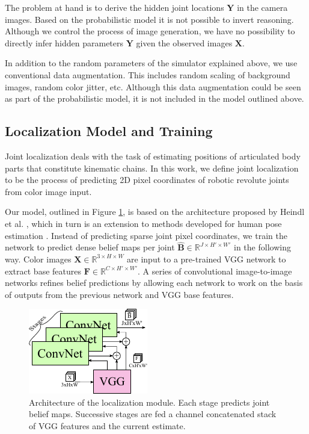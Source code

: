 \documentclass[conference]{IEEEtran}
\begin{document}
    The problem at hand is to derive the hidden joint locations $\mathbf{Y}$ in the camera images. Based on the probabilistic model it is not possible to invert reasoning. Although we control the process of image generation, we have no possibility to directly infer hidden parameters $\mathbf{Y}$ given the observed images $\mathbf{X}$. 
    
    In addition to the random parameters of the simulator explained above, we use conventional data augmentation. This includes random scaling of background images, random color jitter, etc. Although this data augmentation could be seen as part of the probabilistic model, it is not included in the model outlined above. 
    

\subsection{Localization Model and Training}

    Joint localization deals with the task of estimating positions of articulated body parts that constitute kinematic chains. In this work, we define joint localization to be the process of predicting 2D pixel coordinates of robotic revolute joints from color image input. 
    
    Our model, outlined in Figure \ref{fig:jointmodel}, is based on the architecture proposed by Heindl et al. \cite{cheind2019disp}, which in turn is an extension to methods developed for human pose estimation \cite{cao2017realtime, newell2016stacked}. Instead of predicting sparse joint pixel coordinates, we train the network to predict dense belief maps per joint $\hat{\mathbf{B}} \in \mathbb{R}^{J \times H' \times W'}$ in the following way. Color images $\mathbf{X} \in \mathbb{R}^{3 \times H\times W}$ are input to a pre-trained VGG network \cite{simonyan2014very} to extract base features $\mathbf{F} \in \mathbb{R}^{C \times H' \times W'}$. A series of convolutional image-to-image networks refines belief predictions by allowing each network to work on the basis of outputs from the previous network and VGG base features.

    \begin{figure} [!h]
        \centering
        \includegraphics[width=0.7\columnwidth]{figures/joint_model/joint_model.pdf}
        \caption {
            \label{fig:jointmodel} 
            Architecture of the localization module. Each stage predicts joint belief maps. Successive stages are fed a channel concatenated stack of VGG features and the current estimate.
        }
    \end{figure}
\end{document}
